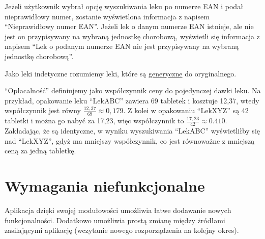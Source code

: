 \documentclass{article}
\begin{document}
  Jeżeli użytkownik wybrał opcję wyszukiwania leku po numerze EAN i podał nieprawidłowy numer, zostanie wyświetlona informacja z napisem
  ``Nieprawidłowy numer EAN''.
  Jeżeli lek o danym numerze EAN istnieje, ale nie jest on przypisywany na wybraną jednostkę chorobową, wyświetli się informacja z napisem
  ``Lek o podanym numerze EAN nie jest przypisywany na wybraną jednostkę chorobową''.

  Jako leki indetyczne rozumiemy leki, które są
  \href{https://www.eupati.eu/pl/rodzaje-lekow/leki-generyczne/}{generyczne} do oryginalnego.

  ``Opłacalność'' definiujemy jako współczynnik ceny do pojedynczej dawki leku.
  Na przykład, opakowanie leku ``LekABC'' zawiera 69 tabletek i kosztuje 12,37, wtedy współczynnik jest równy $\frac{12,37}{69} \approx 0,179$.
  Z kolei w opakowaniu ``LekXYZ'' są 42 tabletki i można go nabyć za 17,23, więc współczynnik to $\frac{17,23}{42} \approx 0.410$.
  Zakładając, że są identyczne, w wyniku wyszukiwania ``LekABC'' wyświetliłby się nad ``LekXYZ'', gdyż ma mniejszy współczynnik,
  co jest równoważne z mniejszą ceną za jedną tabletkę.

  \section{Wymagania niefunkcjonalne}

  Aplikacja dzięki swojej modułowości umożliwia łatwe dodawanie nowych funkcjonalności.
  Dodatkowo umożliwia prostą zmianę między żródłami zasilającymi aplikację (wczytanie nowego rozporządzenia na kolejny okres).
\end{document}

